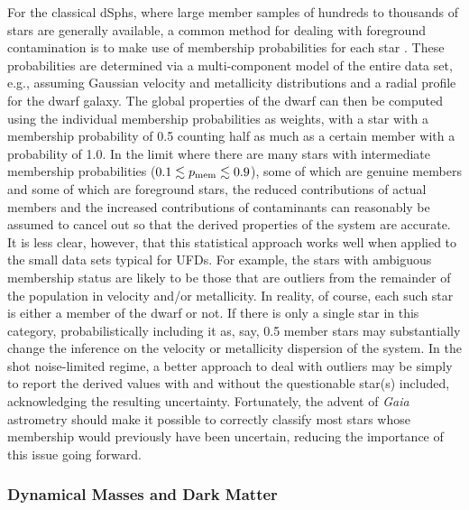 \documentclass[a4paper]{ar-1col}
\begin{document}
For the classical dSphs, where large member samples of hundreds to
thousands of stars are generally available, a common method for
dealing with foreground contamination is to make use of membership
probabilities for each star \citep[e.g.,][]{walker09b,caldwell17}.
These probabilities are determined via a multi-component model of the
entire data set, e.g., assuming Gaussian velocity and metallicity
distributions and a \citet{plummer11} radial profile for the dwarf
galaxy.  The global properties of the dwarf can then be computed using
the individual membership probabilities as weights, with a star with a
membership probability of 0.5 counting half as much as a certain
member with a probability of 1.0.  In the limit where there are many
stars with intermediate membership probabilities ($0.1 \lesssim p_{\rm
  mem} \lesssim 0.9$), some of which are genuine members and some of
which are foreground stars, the reduced contributions of actual
members and the increased contributions of contaminants can reasonably
be assumed to cancel out so that the derived properties of the system
are accurate.  It is less clear, however, that this statistical
approach works well when applied to the small data sets typical for
UFDs.  For example, the stars with ambiguous membership status are
likely to be those that are outliers from the remainder of the
population in velocity and/or metallicity.  In reality, of course,
each such star is either a member of the dwarf or not.  If there is
only a single star in this category, probabilistically including it
as, say, 0.5 member stars may substantially change the inference on
the velocity or metallicity dispersion of the system.  In the shot
noise-limited regime, a better approach to deal with outliers may be
simply to report the derived values with and without the questionable
star(s) included, acknowledging the resulting uncertainty.
Fortunately, the advent of \emph{Gaia} astrometry should make it
possible to correctly classify most stars whose membership would
previously have been uncertain, reducing the importance of this issue
going forward.


\subsubsection{Dynamical Masses and Dark Matter}
\end{document}
